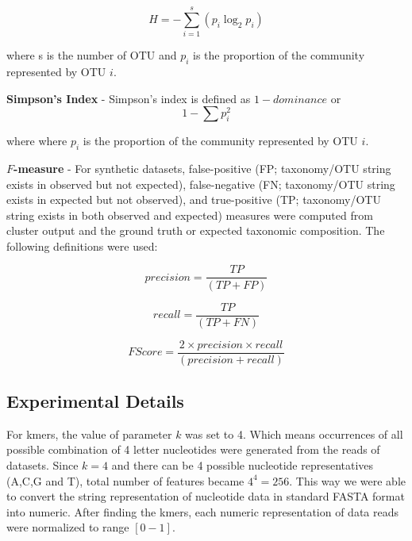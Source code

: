 \documentclass[10pt, conference, compsocconf]{IEEEtran}
\begin{document}
\begin{equation}
H={-} \sum_{i=1}^{s} \left( p_i\log_2p_i \right)
\end{equation}

where s is the number of OTU and $p_i$ is the proportion of the community represented by OTU $i$.

\hspace*{4mm}\textbf{Simpson's Index} - Simpson’s index is defined as ${1-dominance}$ or
\begin{equation}
1 - \sum p_i^2
\end{equation}

where where $p_i$ is the proportion of the community represented by OTU $i$.

\hspace*{4mm}\textbf{$F$-measure} - For synthetic datasets, false-positive (FP; taxonomy/OTU string exists in observed but not expected), false-negative (FN; taxonomy/OTU string exists in expected but not observed), and true-positive (TP; taxonomy/OTU string exists in both observed and expected) measures were computed from cluster output and the ground truth or expected taxonomic composition. The following definitions were used:

\begin{equation}
precision = \frac{TP}{(TP + FP)}
\end{equation}

\begin{equation}
recall = \frac{TP}{(TP + FN)}
\end{equation}

\begin{equation}
F Score = \frac{2 \times precision \times recall}{(precision + recall)}
\end{equation}

\subsection{Experimental Details}
For kmers, the value of parameter $k$ was set to 4. Which means occurrences of all possible combination of 4 letter nucleotides were generated from the reads of datasets. Since $k=4$ and there can be 4 possible nucleotide representatives (A,C,G and T), total number of features became $4^4=256$. This way we were able to convert the string representation of nucleotide data in standard FASTA format into numeric. After finding the kmers, each numeric representation of data reads were normalized to range $\left[0-1\right]$.
\end{document}
